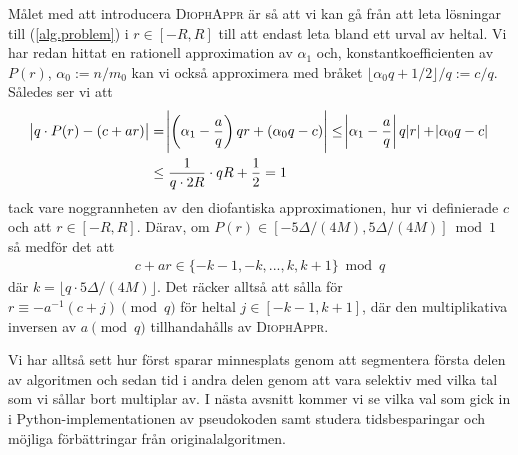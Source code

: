 Målet med att introducera \textsc{DiophAppr} är så att vi kan gå från att leta lösningar till (\ref{alg.problem}) i \(r \in [-R, R]\) till att endast leta bland ett urval av heltal. Vi har redan hittat en rationell approximation av \(\alpha_1\) och, konstantkoefficienten av \(P(r)\), \(\alpha_0 := n / m_0\) kan vi också approximera med bråket \(\lfloor \alpha_0 q + 1/2 \rfloor / q := c / q\). Således ser vi att
\begin{align*}
    \abs{q \cdot P(r) - (c + ar)} &= \abs{\left(\alpha_1 - \frac{a}{q}\right) q r + \left( \alpha_0 q - c\right)} \leq 
    \abs{\alpha_1 - \frac{a}{q}} q \abs{r} + \abs{\alpha_0 q - c} \\
    &\leq \frac{1}{q \cdot 2R} \cdot qR + \frac{1}{2}  = 1
\end{align*}
tack vare noggrannheten av den diofantiska approximationen, hur vi definierade \(c\) och att \(r \in [-R, R]\). Därav, om \(P(r) \in [-5\Delta/(4M), 5\Delta/(4M)] \bmod 1\) så medför det att
\begin{align*}
    c + ar \in \{- k - 1, - k, ... , k, k + 1\} \bmod q
\end{align*}
där \(k = \lfloor q \cdot 5\Delta/(4M) \rfloor\). Det räcker alltså att sålla för \(r \equiv - a^{-1} (c + j) \pmod{q}\) för heltal \(j \in [-k-1, k+1]\), där den multiplikativa inversen av $a \pmod{q}$ tillhandahålls av \textsc{DiophAppr}. %

Vi har alltså sett hur \cite{HaraldSieve} först sparar minnesplats genom att segmentera första delen av algoritmen och sedan tid i andra delen genom att vara selektiv med vilka tal som vi sållar bort multiplar av. I nästa avsnitt kommer vi se vilka val som gick in i Python-implementationen av pseudokoden samt studera tidsbesparingar och möjliga förbättringar från originalalgoritmen.

